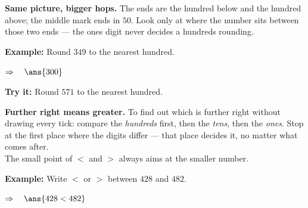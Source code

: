 \documentclass[12pt]{article}
\begin{document}
\begin{formulabox}
\textbf{Same picture, bigger hops.} The ends are the hundred below and the
hundred above; the middle mark ends in $50$. Look only at where the number sits
between those two ends --- the ones digit never decides a hundreds rounding.
\end{formulabox}

\begin{examplebox}
\textbf{Example:} Round $349$ to the nearest hundred.
\begin{center}
\end{center}

$\Rightarrow\quad \ans{300}$
\end{examplebox}

\begin{tryitbox}
\textbf{Try it:} Round $571$ to the nearest hundred.\\[2pt]
\end{tryitbox}


\begin{formulabox}
\textbf{Further right means greater.} To find out which is further right without
drawing every tick: compare the \emph{hundreds} first, then the \emph{tens},
then the \emph{ones}. Stop at the first place where the digits differ --- that
place decides it, no matter what comes after.\\[3pt]
The small point of $<$ and $>$ always aims at the smaller number.
\end{formulabox}

\begin{examplebox}
\textbf{Example:} Write $<$ or $>$ between $428$ and $482$.

$\Rightarrow\quad \ans{428 < 482}$
\end{examplebox}
\end{document}
